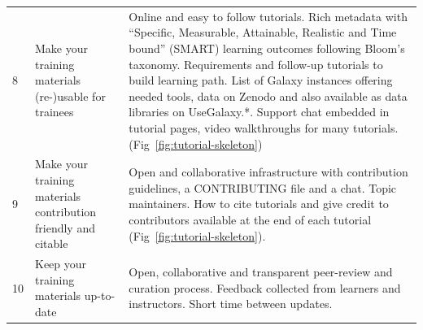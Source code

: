 \begin{table}[h!t]
\begin{tabular}{|l|p{}|p{}|}
        \rule{0pt}{3.6ex}
		8 & Make your training materials (re-)usable for trainees                          & Online and easy to follow tutorials. Rich metadata with ``Specific, Measurable, Attainable, Realistic and Time bound'' (SMART) learning outcomes following Bloom's taxonomy. Requirements and follow-up tutorials to build learning path. List of Galaxy instances offering needed tools, data on Zenodo and also available as data libraries on UseGalaxy.*. Support chat embedded in tutorial pages, video walkthroughs for many tutorials. (Fig~\ref{fig:tutorial-skeleton})\\
		
		\rule{0pt}{3.6ex}
		9 & Make your training materials contribution friendly and citable                & Open and collaborative infrastructure with contribution guidelines, a CONTRIBUTING file and a chat. Topic maintainers. How to cite tutorials and give credit to contributors available at the end of each tutorial (Fig~\ref{fig:tutorial-skeleton}).\\
		
		\rule{0pt}{3.6ex}
		10 & Keep your training materials up-to-date                                       & Open, collaborative and transparent peer-review and curation process. Feedback collected from learners and instructors. Short time between updates. \\
		
		\hline
	\end{tabular}
\end{table}

